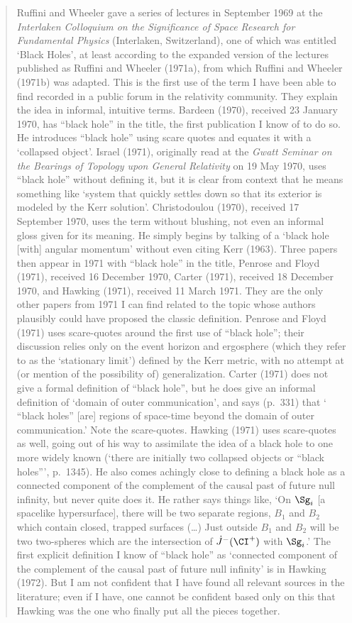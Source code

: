 \documentclass[12pt]{article}
\begin{document}
\begin{quote}
\begin{small}
Ruffini and Wheeler gave a series of lectures in September 1969 at the \emph{Interlaken Colloquium on
the Significance of Space Research for Fundamental Physics} (Interlaken, Switzerland), one of which
was entitled `Black Holes', at least according to the expanded version of the lectures published as
Ruffini and Wheeler (1971a), from which Ruffini and Wheeler (1971b) was adapted. This is the first
use of the term I have been able to find recorded in a public forum in the relativity community.
They explain the idea in informal, intuitive terms. Bardeen (1970), received 23 January 1970,
has ``black hole'' in the title, the first publication I know of to do so. He introduces ``black hole''
using scare quotes and equates it with a `collapsed object'. Israel (1971), originally read at 
 the \emph{Gwatt Seminar on the Bearings of
Topology upon General Relativity} on 19 May 1970, uses ``black hole'' without defining it, but it is clear from context that he
means something like `system that quickly settles down so that its exterior is modeled by the Kerr
solution'.  Christodoulou (1970), received 17 September 1970, uses the term without blushing,
not even an informal gloss given for its meaning. He simply begins by talking of a `black hole
[with] angular momentum' without even citing Kerr (1963). Three papers then appear in 1971
with ``black hole'' in the title, Penrose and Floyd (1971), received 16 December 1970, Carter (1971),
received 18 December 1970, and Hawking (1971), received 11 March 1971. They are the only other
papers from 1971 I can find related to the topic whose authors plausibly could have proposed
the classic definition. Penrose and Floyd (1971) uses scare-quotes around the first use of ``black
hole''; their discussion relies only on the event horizon and ergosphere (which they refer to as the
`stationary limit') defined by the Kerr metric, with no attempt at (or mention of the possibility
of) generalization. Carter (1971) does not give a formal definition of ``black hole'', but he does give
an informal definition of `domain of outer communication', and says (p.\ 331) that `\! ``black holes''
[are] regions of space-time beyond the domain of outer communication.' Note the scare-quotes.
Hawking (1971) uses scare-quotes as well, going out of his way to assimilate the idea of a black
hole to one more widely known (`there are initially two collapsed objects or ``black holes''', p.\ 1345).
He also comes achingly close to defining a black hole as a connected component of the complement
of the causal past of future null infinity, but never quite does it. He rather says things like, 
`On $\Sg_i$ [a spacelike hypersurface], there will be two separate regions, $B_1$ and $B_2$ which contain closed,
trapped surfaces (\ldots)  Just outside $B_1$ and $B_2$ will be two two-spheres which are the intersection
of $\dot{J}^-(\CI^+)$ with $\Sg_i$.' The first explicit definition I know of ``black hole'' as `connected component of the complement of the causal past of future null infinity' is in Hawking (1972). But I am not
confident that I have found all relevant sources in the literature; even if I have, one cannot be
confident based only on this that Hawking was the one who finally put all the pieces together.
 

\end{small}
\end{quote}
\end{document}
